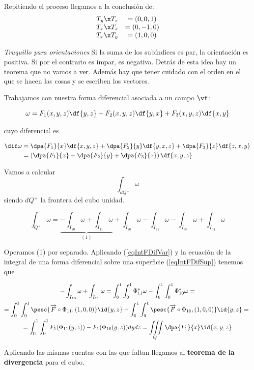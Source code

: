 Repitiendo el proceso llegamos a la conclusión de: \[
\begin{array}{cc}
T_y\x T_z &= (0,0,1)\\
T_x\x T_z &= (0,-1,0)\\
T_x\x T_y &= (1,0,0)
\end{array}\]

\textit{Truquillo para orientaciones} Si la suma de los subíndices es par, la orientación es positiva. Si por el contrario es impar, es negativa. Detrás de esta idea hay un teorema que no vamos a ver. Además hay que tener cuidado con el orden en el que se hacen las cosas y se escriben los vectores.

Trabajamos con nuestra forma diferencial asociada a un campo $\vf$:

\[\omega = F_1(x,y,z)\df{y,z}+F_2(x,y,z)\df{y,x}+F_3(x,y,z)\df{x,y}\]

cuyo diferencial es

\begin{align*}
\dif \omega &= \dpa{F_1}{x}\df{x,y,z} + \dpa{F_2}{y}\df{y,x,z} + \dpa{F_3}{z}\df{z,x,y} \\
	&= \left(\dpa{F_1}{x}+\dpa{F_2}{y} + \dpa{F_3}{z}\right) \df{x,y,z}
\end{align*}

Vamos a calcular \[\int_{dQ^+} \omega\] siendo $dQ^+$ la frontera del cubo unidad.

\[\int_{Q^+} \omega =\underbrace{ -\int_{I_{10}} \omega +  \int_{I_{11}} \omega}_{(1)} + \int_{I_{20}} \omega -  \int_{I_{21}} \omega  -\int_{I_{30}} \omega +  \int_{I_{31}} \omega\]

Operamos (1) por separado. Aplicando (\ref{eqIntFDifVar}) y la ecuación de la integral de una forma diferencial sobre una superficie (\ref{eqIntFDifSup}) tenemos que

\begin{gather*}
 -\int_{I_{10}} \omega +  \int_{I_{11}} \omega = \int_0^1\int_0^1\Phi^{\ast}_{11}\omega - \int_0^1\int_0^1 \Phi^{\ast}_{10} \omega = \\
 = \int_0^1\int_0^1 \pesc{\overrightarrow{F}\circ \Phi_{11},(1,0,0)}\id{y,z}
 -\int_0^1\int_0^1 \pesc{\overrightarrow{F}\circ \Phi_{10},(1,0,0)}\id{y,z}= \\
= \int_0^1\int_0^1 F_1(\Phi_{11}(y,z))-F_1(\Phi_{10}(y,z))dydz = \iiint\limits_Q \dpa{F_1}{x}\id{x,y,z}
\end{gather*}

Aplicando las mismas cuentas con las que faltan llegamos al \textbf{teorema de la divergencia} para el cubo.


